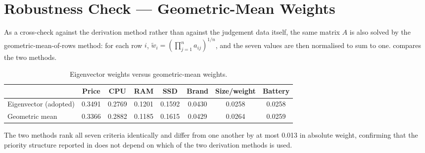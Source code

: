 \section{Robustness Check --- Geometric-Mean Weights}\label{app:ahp-step4}

As a cross-check against the derivation method rather than against the judgement data
itself, the same matrix $A$ is also solved by the geometric-mean-of-rows method: for each
row $i$, $\tilde{w}_i = \left(\prod_{j=1}^{n} a_{ij}\right)^{1/n}$, and the seven values are
then normalised to sum to one.  compares the two methods.

\begin{table}[htbp]
  \centering
  \caption{Eigenvector weights versus geometric-mean weights.}
  \label{tab:ahp-geomean}
  \begin{tabular}{@{}lccccccc@{}}
    \toprule
     & \textbf{Price} & \textbf{CPU} & \textbf{RAM} & \textbf{SSD} & \textbf{Brand} & \textbf{Size/weight} & \textbf{Battery} \\
    \midrule
    Eigenvector (adopted)  & 0.3491 & 0.2769 & 0.1201 & 0.1592 & 0.0430 & 0.0258 & 0.0258 \\
    Geometric mean         & 0.3366 & 0.2882 & 0.1185 & 0.1615 & 0.0429 & 0.0264 & 0.0259 \\
    \bottomrule
  \end{tabular}
\end{table}

The two methods rank all seven criteria identically and differ from one another by at most
0.013 in absolute weight, confirming that the priority structure reported in
 does not depend on which of the two derivation methods is used.
